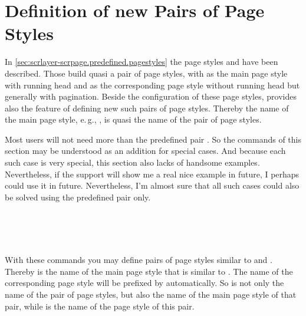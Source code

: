 \section{Definition of new Pairs of Page Styles}
\label{sec:scrlayer-scrpage.pagestyle.pairs}

In \autoref{sec:scrlayer-scrpage.predefined.pagestyles} the page styles
 and  have been
described. Those build quasi a pair of page styles, with
 as the main page style with running head and
 as the corresponding  page
style without running head but generally with pagination. Beside the
configuration of these page styles,  provides also
the feature of defining new such pairs of page styles. Thereby the name of the
main page style, e.\,g., , is quasi the name of the
pair of page styles.

Most users will not need more than the predefined pair
. So the commands of this section may be understood as
an addition for special cases. And because each such case is very special,
this section also lacks of handsome examples. Nevertheless, if the support
will show me a real nice example in future, I perhaps could use it in
future. Nevertheless, I'm almost sure that all such cases could also be
solved using the predefined pair only.

\begin{Declaration}
  \\
  \\
  \\
\end{Declaration}
%
%
%
%
With these commands you may define pairs of page styles similar to
 and . Thereby
 is the name of the main page style that is similar to
. The name of the corresponding  page
style will be prefixed by  automatically. So  is
not only the name of the pair of page styles, but also the name of the main
page style of that pair, while  is the name of the
 page style of this pair.

